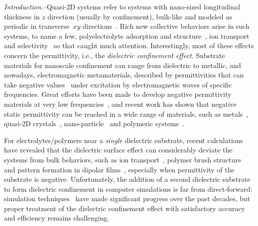 \documentclass[aps,prl,reprint,showpacs,floatfix,superscriptaddress]{revtex4-2}
\begin{document}


\maketitle


\textit{Introduction.}--Quasi-2D systems refer to systems with nano-sized longitudinal thickness in $z$ direction (usually by confinement), bulk-like and modeled as periodic in transverse~$xy$ directions~\cite{mazars2011long}. 
Rich new collective behaviors arise in such systems, to name a few, polyelectrolyte adsorption and structure~\cite{messina2004effect,yuan2020structure}, ion transport and selectivity~\cite{nishizawa1995metal,cervera2006ionic} so that caught much attention.
Interestingly, most of these effects concern the permittivity, i.e., the \emph{dielectric confinement effect}.
Substrate materials for nanoscale confinement can range from dielectric to metallic, and nowadays, electromagnetic metamaterials, described by permittivities that can take negative values~\cite{veselago1967electrodynamics, smith2004metamaterials} under excitation by electromagnetic waves of specific frequencies.
Great efforts have been made to develop negative permittivity materials at very low frequencies~\cite{cheng2017tunable, xie2022recent, xu2020polyaniline}, and recent work has shown that negative static permittivity can be reached in a wide range of materials, such as metals~\cite{kana2016thermally}, quasi-2D crystals~\cite{nazarov2015negative}, nano-particle~\cite{shulman2007plasmalike} and polymeric systems~\cite{yan2013negative}.


For electrolytes/polymers near a \emph{single} dielectric substrate, recent calculations have revealed that the dielectric surface effect can considerably deviate the systems from bulk behaviors, such as ion transport~\cite{antila2018dielectric}, polymer brush structure~\cite{yuan2020structure} and pattern formation in dipolar films~\cite{wang2019dielectric}, especially when permittivity of the substrate is negative.
Unfortunately, the addition of a second dielectric substrate to form dielectric confinement in computer simulations is far from direct-forward: simulation techniques~\cite{arnold2002electrostatics, de2002electrostatics,tyagi2007icmmm2d,fernandez2010collection,jadhao2012simulation,zwanikken2013tunable,fahrenberger2014computing,dos2017simulations,yu2018plasmonic,liang2020harmonic,yuan2021particle,maxian2021fast} have made significant progress over the past decades, but proper treatment of the dielectric confinement effect with satisfactory accuracy and efficiency remains challenging.
\end{document}

